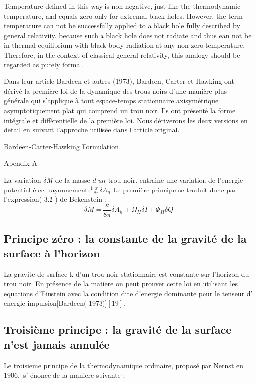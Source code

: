 Temperature defined in this way is non-negative, just like the thermodynamic temperature, and equals zero only for extremal black holes. However, the term temperature can not be successfully applied to a black hole fully described by general relativity. because such a black hole does not radiate and thus ean not be in thermal equilibrium with black body radiation at any non-zero temperature. Therefore, in the context of elassical general relativity, this analogy should be regarded as purely formal.



Dans leur article Bardeen et autres (1973), Bardeen, Carter et Hawking ont dérivé la première loi de la dynamique des trous noirs d'une manière plus générale qui s'applique à tout espace-temps stationnaire axisymétrique asymptotiquement plat qui comprend un trou noir. Ils ont présenté la forme intégrale et différentielle de la première loi. Nous dériverons les deux versions en détail en suivant l'approche utilisée dans l'article original.


 Bardeen-Carter-Hawking Formulation

 Apendix A


La variation $\delta M$ de la masse $d^{\prime} u n$ trou noir. entraine une variation de l'energie potentiel élec-
rayonnements$^{1} \frac{x}{8 \pi} \delta A_{n}$
Le première principe se traduit donc par l'expression( 3.2 ) de Bekenstein :
$$
\delta M=\frac{\kappa}{8 \pi} \delta A_{h}+\Omega_{H} \delta I+\Phi_{H} \delta Q
$$


\subsection{Principe zéro : la constante de la gravité de la surface à l'horizon }

 
La gravite de surface $\mathrm{k}$ d'un trou noir stationnaire est constante sur l'horizon du trou noir.
En présence de la matiere on peut prouver cette loi en utilisant les equations d'Einstein avec la condition dite d'energie dominante pour le tenseur d' energie-impulsion[Bardeen( 1973$)][19]$.




\subsection{Troisième principe :  la gravité de la surface n'est jamais annulée }


Le troisieme principe de la thermodynamique ordinaire, proposé par Nernst en $1906,$ s' énonce de la maniere suivante :

